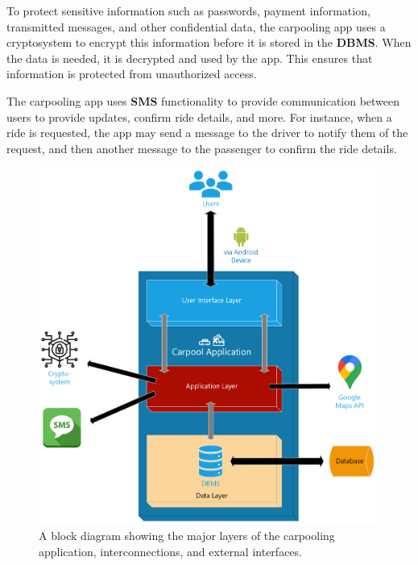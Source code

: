 \documentclass[]{article}
\begin{document}
To protect sensitive information such as passwords, payment information, transmitted messages, and other confidential data, the carpooling app uses a cryptosystem to encrypt this information before it is stored in the \textbf{DBMS}. When the data is needed, it is decrypted and used by the app. This ensures that information is protected from unauthorized access.

The carpooling app uses \textbf{SMS} functionality to provide communication between users to provide updates, confirm ride details, and more. For instance, when a ride is requested, the app may send a message to the driver to notify them of the request, and then another message to the passenger to confirm the ride details.

\begin{figure}[h!]
	\centering
	\includegraphics[width=30em]{ProductPerspectiveBlockDiagram.png}
	\caption{A block diagram showing the major layers of the carpooling application, interconnections, and external interfaces.}
	\label{fig:blockdiagram}
\end{figure}
\end{document}
